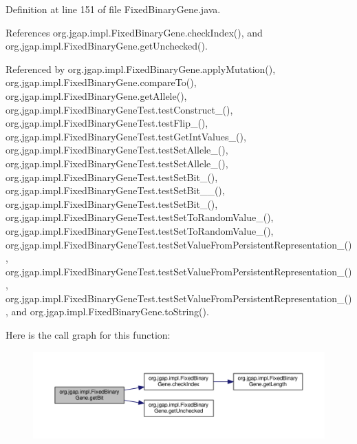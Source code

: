 Definition at line 151 of file Fixed\-Binary\-Gene.\-java.



References org.\-jgap.\-impl.\-Fixed\-Binary\-Gene.\-check\-Index(), and org.\-jgap.\-impl.\-Fixed\-Binary\-Gene.\-get\-Unchecked().



Referenced by org.\-jgap.\-impl.\-Fixed\-Binary\-Gene.\-apply\-Mutation(), org.\-jgap.\-impl.\-Fixed\-Binary\-Gene.\-compare\-To(), org.\-jgap.\-impl.\-Fixed\-Binary\-Gene.\-get\-Allele(), org.\-jgap.\-impl.\-Fixed\-Binary\-Gene\-Test.\-test\-Construct\-\_(), org.\-jgap.\-impl.\-Fixed\-Binary\-Gene\-Test.\-test\-Flip\-\_(), org.\-jgap.\-impl.\-Fixed\-Binary\-Gene\-Test.\-test\-Get\-Int\-Values\-\_(), org.\-jgap.\-impl.\-Fixed\-Binary\-Gene\-Test.\-test\-Set\-Allele\-\_(), org.\-jgap.\-impl.\-Fixed\-Binary\-Gene\-Test.\-test\-Set\-Allele\-\_(), org.\-jgap.\-impl.\-Fixed\-Binary\-Gene\-Test.\-test\-Set\-Bit\-\_(), org.\-jgap.\-impl.\-Fixed\-Binary\-Gene\-Test.\-test\-Set\-Bit\-\_\-\_(), org.\-jgap.\-impl.\-Fixed\-Binary\-Gene\-Test.\-test\-Set\-Bit\-\_(), org.\-jgap.\-impl.\-Fixed\-Binary\-Gene\-Test.\-test\-Set\-To\-Random\-Value\-\_(), org.\-jgap.\-impl.\-Fixed\-Binary\-Gene\-Test.\-test\-Set\-To\-Random\-Value\-\_(), org.\-jgap.\-impl.\-Fixed\-Binary\-Gene\-Test.\-test\-Set\-Value\-From\-Persistent\-Representation\-\_(), org.\-jgap.\-impl.\-Fixed\-Binary\-Gene\-Test.\-test\-Set\-Value\-From\-Persistent\-Representation\-\_(), org.\-jgap.\-impl.\-Fixed\-Binary\-Gene\-Test.\-test\-Set\-Value\-From\-Persistent\-Representation\-\_(), and org.\-jgap.\-impl.\-Fixed\-Binary\-Gene.\-to\-String().



Here is the call graph for this function\-:
\nopagebreak
\begin{figure}[H]
\begin{center}
\leavevmode
\includegraphics[width=350pt]{classorg_1_1jgap_1_1impl_1_1_fixed_binary_gene_a3f193522e6c09322a2302af6ba843be9_cgraph}
\end{center}
\end{figure}


